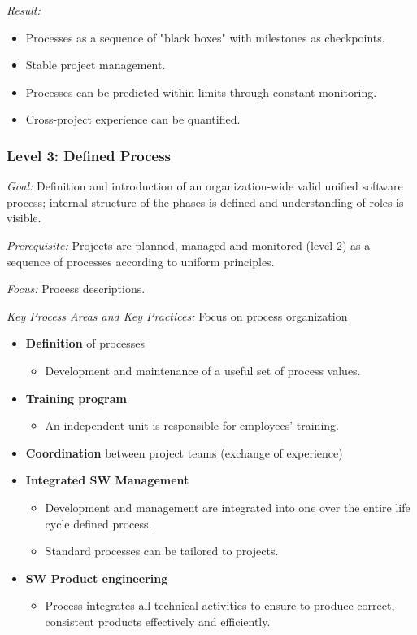 \documentclass[11pt,a4paper]{article}
\begin{document}
\emph{Result:}
\begin {itemize} [noitemsep]
\item Processes as a sequence of "black boxes" with milestones as checkpoints.
\item Stable project management.
\item Processes can be predicted within limits through constant monitoring.
\item Cross-project experience can be quantified.
\end {itemize}

\subsubsection*{Level 3: Defined Process}

\emph{Goal:} Definition and introduction of an organization-wide valid unified
software process; internal structure of the phases is defined and
understanding of roles is visible.

\emph {Prerequisite:} Projects are planned, managed and monitored (level 2) as
a sequence of processes according to uniform principles.

\emph {Focus:} Process descriptions.

\emph {Key Process Areas and Key Practices:} Focus on process organization
\begin {itemize} [noitemsep]
\item \textbf {Definition} of processes
  \begin {itemize} [noitemsep]
  \item Development and maintenance of a useful set of process values.
  \end {itemize}
\item \textbf {Training program}
  \begin {itemize} [noitemsep]
  \item An independent unit is responsible for employees' training.
  \end {itemize}
\item \textbf {Coordination} between project teams (exchange of experience)
\item \textbf {Integrated SW Management}
  \begin {itemize} [noitemsep]
  \item Development and management are integrated into one over the entire
    life cycle defined process.
  \item Standard processes can be tailored to projects.
  \end {itemize}
\item \textbf {SW Product engineering}
  \begin {itemize} [noitemsep]
  \item Process integrates all technical activities to ensure to produce
    correct, consistent products effectively and efficiently.
  \end {itemize}
\end {itemize}
\end{document}
